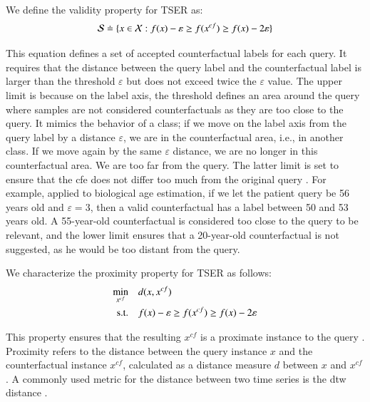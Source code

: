 \begin{definition}
\label{def:validity}
We define the validity property for TSER as:
$$\mathcal{S} \doteq \{x \in \mathcal{X}:f(x) - \varepsilon \geq f(x^{c f}) \geq f(x) - 2\varepsilon\}$$
\end{definition}
This equation defines a set of accepted counterfactual labels for each query. It requires that the distance between the query label and the counterfactual label is larger than the threshold $\varepsilon$ but does not exceed twice the $\varepsilon$ value. The upper limit is because on the label axis, the threshold defines an area around the query where samples are not considered counterfactuals as they are too close to the query. It mimics the behavior of a class; if we move on the label axis from the query label by a distance $\varepsilon$, we are in the counterfactual area, i.e., in another class. If we move again by the same $\varepsilon$ distance, we are no longer in this counterfactual area. We are too far from the query. The latter limit is set to ensure that the  \gls{cfe} does not differ too much from the original query \cite{spooner_counterfactual_2021}.
For example, applied to biological age estimation, if we let the patient query be 56 years old and $\varepsilon = 3$, then a valid counterfactual has a label between 50 and 53 years old. A 55-year-old counterfactual is considered too close to the query to be relevant, and the lower limit ensures that a 20-year-old counterfactual is not suggested, as he would be too distant from the query.   

\begin{definition}
We characterize the proximity property for TSER as follows:
\begin{equation}
\begin{aligned}
\min_{x^{cf}} \quad & d(x, x^{c f})\\
\mathrm{s.t.} \quad & f(x) - \varepsilon \geq f(x^{c f}) \geq f(x) - 2\varepsilon\\
\end{aligned}
\end{equation}
\label{def:proximity}
\end{definition}
This property ensures that the resulting $x^{c f}$ is a proximate instance to the query \cite{mothilal_explaining_2020}. Proximity refers to the distance between the query instance $x$ and the counterfactual instance $x^{c f}$, calculated as a distance measure $d$ between $x$ and $x^{c f}$. A commonly used metric for the distance between two time series is the \gls{dtw} distance \cite{muller_dynamic_2007}.

